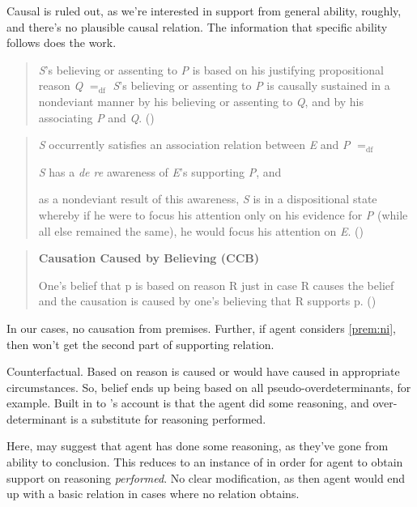 \begin{note}[Causal]
  Causal is ruled out, as we're interested in support from general ability, roughly, and there's no plausible causal relation.
  The information that specific ability follows does the work.

  \cite{Moser:1989tv}
  \begin{quote}
    \emph{S}'s believing or assenting to \emph{P} is based on his justifying propositional reason \emph{Q} \(=_{\text{df}}\) \emph{S}'s believing or assenting to \emph{P} is causally sustained in a nondeviant manner by his believing or assenting to \emph{Q}, and by his associating \emph{P} and \emph{Q}.\nolinebreak
    \mbox{}\hfill\mbox{(\citeyear[157]{Moser:1989tv})}
  \end{quote}

  \begin{quote}
    \emph{S} occurrently satisfies an association relation between \emph{E} and \emph{P} \(=_{\text{df}}\)
    \begin{enumerate*}[label=(\roman*)]
    \item \emph{S} has a \emph{de re} awareness of \emph{E}'s supporting \emph{P}, and
    \item as a nondeviant result of this awareness, \emph{S} is in a dispositional state whereby if he were to focus his attention only on his evidence for \emph{P} (while all else remained the same), he would focus his attention on \emph{E}.
      \newline
      \mbox{}\hfill\mbox{(\citeyear[141--142]{Moser:1989tv})}
    \end{enumerate*}
  \end{quote}

  \cite{Ye:2019ux}
  \begin{quote}
    \textbf{Causation Caused by Believing (CCB)}

    One's belief that p is based on reason R just in case R causes the belief and the causation is caused by one's believing that R supports p.
    \newline
    \mbox{}\hfill\mbox{(\citeyear[27]{Ye:2019ux})}
  \end{quote}
  In our cases, no causation from premises.
  Further, if agent considers \ref{prem:ni}, then won't get the second part of supporting relation.
\end{note}

\begin{note}[Counterfactual]
  Counterfactual.
  Based on reason is caused or would have caused in appropriate circumstances.
  So, belief ends up being based on all pseudo-overdeterminants, for example.
  Built in to \citeauthor{Swain:1981wd}'s account is that the agent did some reasoning, and over-determinant is a substitute for reasoning performed.

  Here, may suggest that agent has done some reasoning, as they've gone from ability to conclusion.
  This reduces to an instance of \AR{} in order for agent to obtain support on reasoning \emph{performed}.
  No clear modification, as then agent would end up with a basic relation in cases where no relation obtains.
\end{note}

